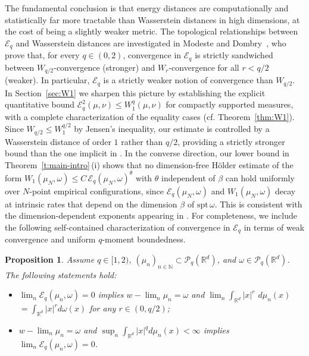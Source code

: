 \documentclass[12pt,a4paper,oneside]{amsart}
\theoremstyle{plain}
\newtheorem{proposition}[theorem]{Proposition}
\theoremstyle{definition}
\numberwithin{equation}{section}
\numberwithin{figure}{section}
\numberwithin{table}{section}
\theoremstyle{remark}
\newcommand{\R}{\mathbb{R}}
\newcommand{\N}{\mathbb{N}}
\newcommand{\expAhlfors}{\beta}
\begin{document}
The fundamental conclusion is that energy distances are computationally and
statistically far more tractable than Wasserstein distances in high dimensions,
at the cost of being a slightly weaker metric. 
The topological relationships between $\mathcal{E}_q$ and Wasserstein distances 
are investigated in Modeste and Dombry~\cite[Theorem 13]{modeste2024}, who prove that, for 
every $q\in(0,2)$, convergence in $\mathcal{E}_q$ is strictly sandwiched between 
$W_{q/2}$-convergence (stronger) and $W_r$-convergence for all $r<q/2$ 
(weaker). In particular, $\mathcal{E}_q$ is a strictly weaker notion of 
convergence than $W_{q/2}$. 
In Section~\ref{sec:W1} we sharpen this picture by establishing 
the explicit quantitative bound 
$\mathcal{E}_q^2(\mu,\nu)\leq W_1^q(\mu,\nu)$ for compactly 
supported measures, with a complete characterization of the equality cases (cf. Theorem~\ref{thm:W1}). 
Since $W_{q/2}\leq W_1^{q/2}$ by Jensen's inequality, our estimate is 
controlled by a Wasserstein distance of order $1$ rather than $q/2$, providing 
a strictly stronger bound than the one implicit in \cite[Theorem~13]{modeste2024}.
In the converse direction, our lower 
bound in Theorem~\ref{t:main-intro}\,(i) shows that no dimension-free Hölder 
estimate of the form $W_1(\mu_N,\omega)\leq C\,\mathcal{E}_q(\mu_N,\omega)^\theta$ 
with $\theta$ independent of $\beta$ can hold uniformly over $N$-point empirical 
configurations, since $\mathcal{E}_q(\mu_N,\omega)$ and $W_1(\mu_N,\omega)$ 
decay at intrinsic rates that depend on the dimension $\expAhlfors$ of 
$\mathrm{spt}\,\omega$. This is consistent with the dimension-dependent 
exponents appearing in \cite[Propositions~16 and 17]{modeste2024}.
For completeness, we include the following 
self-contained characterization of convergence in $\mathcal{E}_q$ in terms of weak convergence and uniform 
$q$-moment boundedness.
\begin{proposition}\label{prop:edtop}
Assume $q \in [1,2)$, $(\mu_n)_{n \in \N} \subset \mathcal P_q(\R^d)$, and $\omega \in \mathcal P_q(\R^d)$. The following statements hold:
\begin{itemize}
    \item[(i)] $\lim_n \mathcal E_q(\mu_n,\omega)= 0$  implies $w-\lim_n \mu_n= \omega$ and $\lim_n \int_{\R^d} |x|^r $ $ d\mu_n(x)$ $= \int_{\R^d} |x|^r d\omega(x)$ for any $r \in (0,q/2)$;
    \item[(ii)]  $w-\lim_n \mu_n= \omega$ and $\sup_n \int_{\R^d} |x|^q d\mu_n(x) < \infty$ implies $\lim_n \mathcal E_q(\mu_n,\omega)= 0$.
\end{itemize}
\end{proposition}
\end{document}
